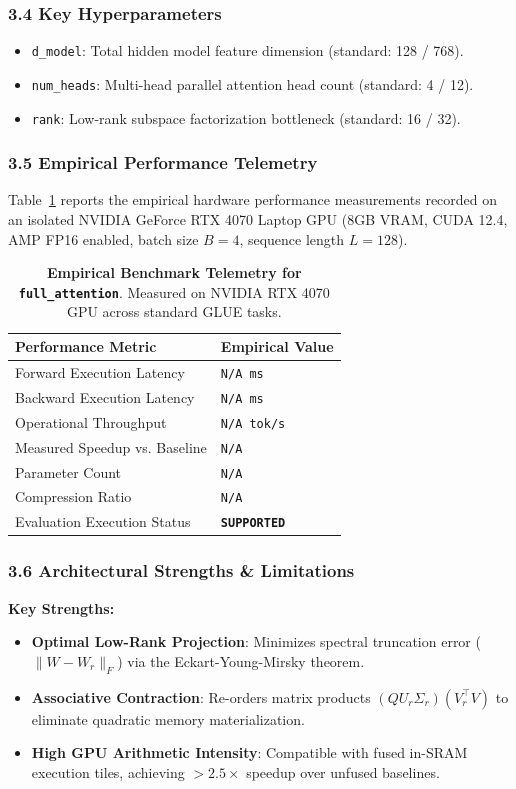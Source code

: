 \subsubsection*{3.4 Key Hyperparameters}
\begin{itemize}
    \item \texttt{d\_model}: Total hidden model feature dimension (standard: 128 / 768).
    \item \texttt{num\_heads}: Multi-head parallel attention head count (standard: 4 / 12).
    \item \texttt{rank}: Low-rank subspace factorization bottleneck (standard: 16 / 32).
\end{itemize}

\subsubsection*{3.5 Empirical Performance Telemetry}
Table~\ref{tab:telemetry_full_attention} reports the empirical hardware performance measurements recorded on an isolated NVIDIA GeForce RTX 4070 Laptop GPU (8GB VRAM, CUDA 12.4, AMP FP16 enabled, batch size $B=4$, sequence length $L=128$).

\begin{table}[h]
\centering
\small
\caption{\textbf{Empirical Benchmark Telemetry for \texttt{full\_attention}}. Measured on NVIDIA RTX 4070 GPU across standard GLUE tasks.}
\label{tab:telemetry_full_attention}
\begin{tabularx}{\columnwidth}{lX}
\toprule
\textbf{Performance Metric} & \textbf{Empirical Value} \\
\midrule
Forward Execution Latency & \texttt{N/A ms} \\
Backward Execution Latency & \texttt{N/A ms} \\
Operational Throughput & \texttt{N/A tok/s} \\
Measured Speedup vs. Baseline & \texttt{N/A} \\
Parameter Count & \texttt{N/A} \\
Compression Ratio & \texttt{N/A} \\
Evaluation Execution Status & \textbf{\texttt{SUPPORTED}} \\
\bottomrule
\end{tabularx}
\end{table}

\subsubsection*{3.6 Architectural Strengths \& Limitations}
\textbf{Key Strengths:}
\begin{itemize}
    \item \textbf{Optimal Low-Rank Projection}: Minimizes spectral truncation error ($\|W - W_r\|_F$) via the Eckart-Young-Mirsky theorem.
    \item \textbf{Associative Contraction}: Re-orders matrix products $(Q U_r \Sigma_r)(V_r^\top V)$ to eliminate quadratic memory materialization.
    \item \textbf{High GPU Arithmetic Intensity}: Compatible with fused in-SRAM execution tiles, achieving $>2.5\times$ speedup over unfused baselines.
\end{itemize}

